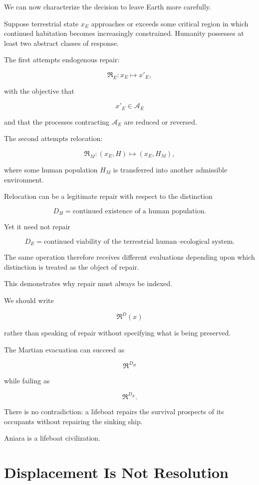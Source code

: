 \documentclass[11pt,oneside]{book}
\theoremstyle{definition}
\theoremstyle{remark}
\newcommand{\A}{\mathcal{A}}
\newcommand{\Repair}{\mathfrak{R}}
\begin{document}
We can now characterize the decision to leave Earth more carefully.

Suppose terrestrial state \(x_E\) approaches or exceeds some critical region in which continued habitation becomes increasingly constrained. Humanity possesses at least two abstract classes of response.

The first attempts endogenous repair:

\[
\Repair_E:
x_E
\mapsto
x'_E,
\]

with the objective that

\[
x'_E\in\A_E
\]

and that the processes contracting \(\A_E\) are reduced or reversed.

The second attempts relocation:

\[
\Repair_M:
(x_E,H)
\mapsto
(x_E,H_M),
\]

where some human population \(H_M\) is transferred into another admissible environment.

Relocation can be a legitimate repair with respect to the distinction

\[
D_H=\text{continued existence of a human population}.
\]

Yet it need not repair

\[
D_E=\text{continued viability of the terrestrial human--ecological system}.
\]

The same operation therefore receives different evaluations depending upon which distinction is treated as the object of repair.

This demonstrates why repair must always be indexed.

We should write

\[
\Repair^{D}(x)
\]

rather than speaking of repair without specifying what is being preserved.

The Martian evacuation can succeed as

\[
\Repair^{D_H}
\]

while failing as

\[
\Repair^{D_E}.
\]

There is no contradiction: a lifeboat repairs the survival prospects of its occupants without repairing the sinking ship.

Aniara is a lifeboat civilization.

\section{Displacement Is Not Resolution}
\end{document}

